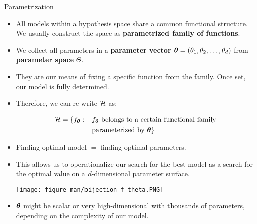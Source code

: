 \documentclass[11pt,compress,t,notes=noshow, xcolor=table]{beamer}
\begin{document}
\begin{vbframe}{Parametrization}
  
  \begin{itemize}
    
    \item All models within a hypothesis space share a common functional 
    structure. We usually construct the space as 
    \textbf{parametrized family of functions}.
    
    
    \item We collect all parameters in a \textbf{parameter vector} 
    $\bm{\theta} = (\theta_1, \theta_2, \ldots, \theta_d)$ from \textbf{parameter space} 
    $\Theta$.
    
    \item They are our means of fixing a specific function from the family. 
    Once set, our model is fully determined.
    
    \item Therefore, we can re-write $\mathcal{H}$ as:
    
    \begin{equation*}
      \begin{split}
        \mathcal{H} = \{f_{\bm{\theta}}: \quad & f_{\bm{\theta}} \text{ belongs to a certain
        functional family } \\
        & \text{parameterized by } \bm{\theta}\}
      \end{split}
    \end{equation*}
    
    
    \framebreak
    
    \item Finding optimal model $=$ 
    finding optimal parameters.
    
    \item This allows us to operationalize our search
    for the best model as a search for the optimal value on a $d$-dimensional
    parameter surface.
    
    \begin{center}
      \texttt{[image: figure\_man/bijection\_f\_theta.PNG]} 
    \end{center}
    
    \item $\bm{\theta}$ might be scalar or very high-dimensional with thousands of parameters,
    depending on the complexity of our model.
    

\end{itemize}
\end{vbframe}
\end{document}
